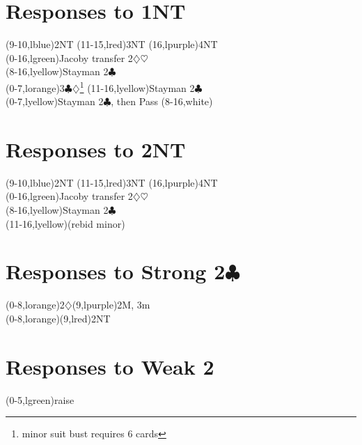 \documentclass{article}
\def\C{$\clubsuit$}
\def\D{$\diamondsuit$}
\def\H{$\heartsuit$}
\def\S{$\spadesuit$}
\begin{document}
\section{Responses to 1NT}
\begin{ptable}
  \bid(9-10,lblue){2NT}
  \bid(11-15,lred){3NT}
  \bid(16,lpurple){4NT}\\
  \bid(0-16,lgreen){Jacoby transfer 2\D\H}\\
  \bid(8-16,lyellow){Stayman 2\C}\\
  \bid(0-7,lorange){3\C\D\footnote{minor suit bust requires 6 cards}}
  \bid*(11-16,lyellow){Stayman 2\C}\\
\row{444 in \D\H\S}
  \bid(0-7,lyellow){Stayman 2\C, then Pass}
  \bid(8-16,white){\ditto{1.7in}}\\
\end{ptable}

\section{Responses to 2NT}
\begin{ptable}
  \bid(9-10,lblue){2NT}
  \bid(11-15,lred){3NT}
  \bid(16,lpurple){4NT}\\
  \bid(0-16,lgreen){Jacoby transfer 2\D\H}\\
  \bid(8-16,lyellow){Stayman 2\C}\\
  \bid(11-16,lyellow){(rebid minor)}\\
\end{ptable}

\section{Responses to Strong 2\C}
\begin{ptable}
\bid*(0-8,lorange){2\D}\bid(9,lpurple){2M, 3m}\\
\bid(0-8,lorange){\cdrop[-.45pc]{2\D}}\bid(9,lred){2NT}\\
\end{ptable}

\section{Responses to Weak 2}
\begin{ptable}
\bid(0-5,lgreen){raise}\\
\end{ptable}
\end{document}
